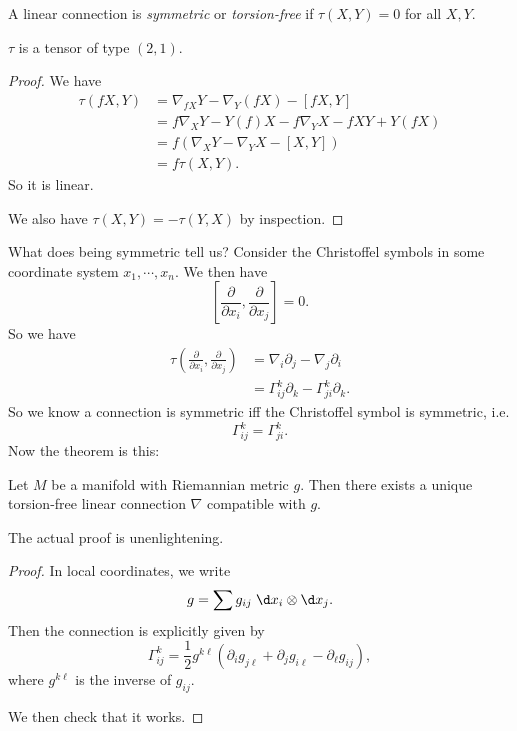 \documentclass[a4paper]{article}
\begin{document}
\begin{defi}
  A linear connection is \emph{symmetric} or \emph{torsion-free} if $\tau(X, Y) = 0$ for all $X, Y$.
\end{defi}

\begin{prop}
  $\tau$ is a tensor of type $(2, 1)$.
\end{prop}

\begin{proof}
  We have
  \begin{align*}
    \tau(fX, Y) &= \nabla_{fX}Y - \nabla_Y(fX) - [fX, Y]\\
    &= f\nabla_X Y - Y(f) X - f \nabla_Y X - fXY + Y(f X)\\
    &= f(\nabla_X Y - \nabla_Y X - [X, Y])\\
    &= f \tau(X, Y).
  \end{align*}
  So it is linear.

  We also have $\tau(X, Y) = - \tau(Y, X)$ by inspection.
\end{proof}

What does being symmetric tell us? Consider the Christoffel symbols in some coordinate system $x_1, \cdots, x_n$. We then have
\[
  \left[\frac{\partial}{\partial x_i}, \frac{\partial}{\partial x_j}\right] = 0.
\]
So we have
\begin{align*}
  \tau\left(\frac{\partial}{\partial x_i}, \frac{\partial}{\partial x_j}\right) &= \nabla_i \partial_j - \nabla_j \partial_i\\\
  &= \Gamma_{ij}^k \partial_k - \Gamma^k_{ji} \partial_k.
\end{align*}
So we know a connection is symmetric iff the Christoffel symbol is symmetric, i.e.
\[
  \Gamma_{ij}^k = \Gamma_{ji}^k.
\]
Now the theorem is this:
\begin{thm}
  Let $M$ be a manifold with Riemannian metric $g$. Then there exists a unique torsion-free linear connection $\nabla$ compatible with $g$.
\end{thm}

The actual proof is unenlightening.

\begin{proof}
  In local coordinates, we write
  \[
    g = \sum g_{ij} \;\d x_i \otimes \d x_j.
  \]
  Then the connection is explicitly given by
  \[
    \Gamma^k_{ij} = \frac{1}{2} g^{k\ell} (\partial_i g_{j\ell} + \partial_j g_{i\ell} - \partial_\ell g_{ij}),
  \]
  where $g^{k\ell}$ is the inverse of $g_{ij}$.

  We then check that it works.
\end{proof}
\end{document}
